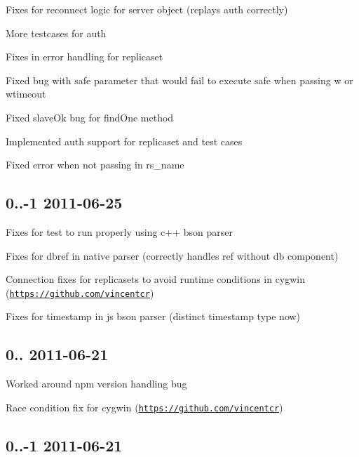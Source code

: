 \begin{DoxyItemize}
\item Fixes for reconnect logic for server object (replays auth correctly)
\item More testcases for auth
\item Fixes in error handling for replicaset
\item Fixed bug with safe parameter that would fail to execute safe when passing w or wtimeout
\item Fixed slave\+Ok bug for find\+One method
\item Implemented auth support for replicaset and test cases
\item Fixed error when not passing in rs\+\_\+name
\end{DoxyItemize}

\subsection*{0..-\/1 2011-\/06-\/25 }


\begin{DoxyItemize}
\item Fixes for test to run properly using c++ bson parser
\item Fixes for dbref in native parser (correctly handles ref without db component)
\item Connection fixes for replicasets to avoid runtime conditions in cygwin (\href{https://github.com/vincentcr}{\tt https\+://github.\+com/vincentcr})
\item Fixes for timestamp in js bson parser (distinct timestamp type now)
\end{DoxyItemize}

\subsection*{0.. 2011-\/06-\/21 }


\begin{DoxyItemize}
\item Worked around npm version handling bug
\item Race condition fix for cygwin (\href{https://github.com/vincentcr}{\tt https\+://github.\+com/vincentcr})
\end{DoxyItemize}

\subsection*{0..-\/1 2011-\/06-\/21 }



